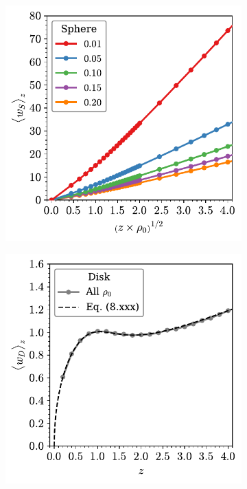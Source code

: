 \begin{figure}
     \begin{subfigure}[b]{0.48\textwidth}
         \centering
         \includegraphics[width=\textwidth]{./figures/quasi2d/w_z_3d_sphere.pdf}
         \caption{}
         \label{fig:nphic}
     \end{subfigure}
     \hfill
      \begin{subfigure}[b]{0.48\textwidth}
         \centering
         \includegraphics[width=\textwidth]{./figures/quasi2d/w_z_3d_disk.pdf}
         \caption{}
         \label{fig:nphid}
     \end{subfigure}
     \hfill
	

\end{figure}
